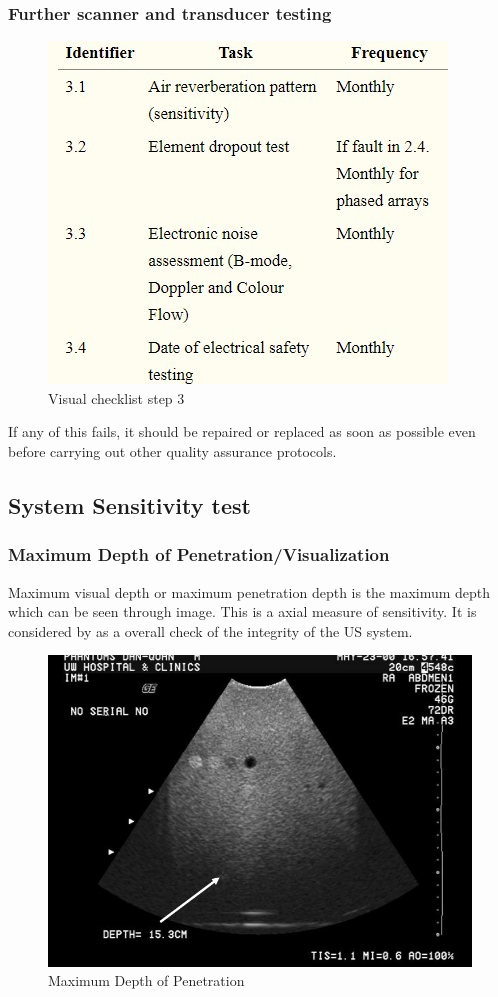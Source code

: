 \documentclass[12pt]{article}
\begin{document}
\subsubsection{Further scanner and transducer testing}
\begin{figure}[!h]
    \centering
    \includegraphics[width=0.6\linewidth]{vc2.jpg}
    \caption{\small{Visual checklist step 3}}
    \label{fig:Visual checklist for US}
\end{figure}


If any of this fails, it should be repaired or replaced as soon as possible even before carrying out other quality assurance protocols. 

\subsection{System Sensitivity test}
\subsubsection{Maximum Depth of Penetration/Visualization}
Maximum visual depth or maximum penetration depth is the maximum depth which can be seen through image. This is a axial measure of sensitivity. It is considered by as a overall check of the integrity of the US system. 
\begin{figure}[!h]
    \centering
    \includegraphics[width=0.6\linewidth]{md.jpg}
    \caption{\small{Maximum Depth of Penetration}}
    \label{fig:Maximum Depth of Penetration}
\end{figure}
\end{document}
